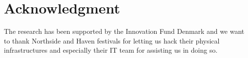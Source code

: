 \documentclass[10pt, conference, compsocconf]{IEEEtran}
\begin{document}
\IEEEpeerreviewmaketitle













\section*{Acknowledgment}
The research has been supported by the Innovation Fund Denmark and we want to thank Northside and Haven festivals for letting us hack their physical infrastructures and especially their IT team for assisting us in doing so.



\end{document}
